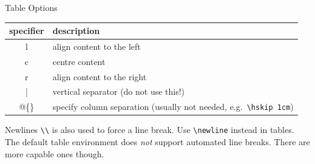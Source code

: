 \documentclass[final,aspectratio=43]{beamer}
\begin{document}
\begin{frame}[fragile]{Table Options}
    \begin{tabular}{cL{10cm}}
    specifier & description \\
    \hline
    l & align content to the left \\
    c & centre content \\
    r & align content to the right \\
    | & vertical separator (do not use this!) \\
    @\{\} & specify column separation (usually not needed, e.g.\ \texttt{\textbackslash hskip 1cm})\\
    \end{tabular}

    \begin{alertblock}{Newlines}
        \texttt{\textbackslash\textbackslash} is also used to force a line break. Use \texttt{\textbackslash newline} instead in tables. The default table environment does \emph{not} support automated line breaks. There are more capable ones though.
    \end{alertblock}
\end{frame}


    

%
%
%
\end{document}
